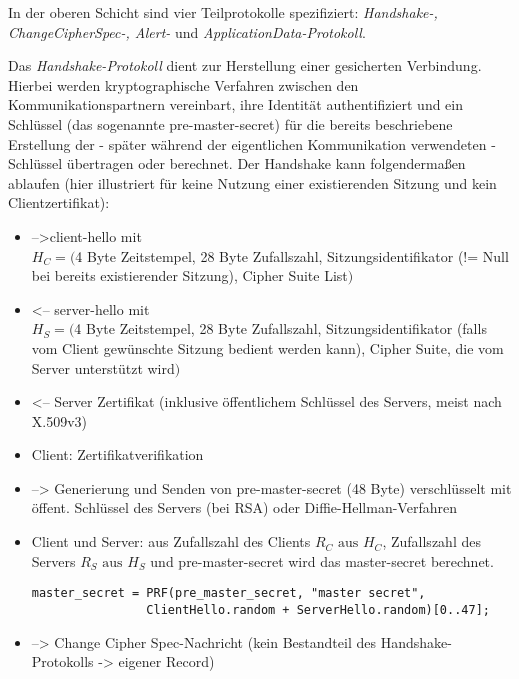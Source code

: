 \documentclass[
    12pt,
    headings=small,
    parskip=half,           %
    bibliography=totoc,
    numbers=noenddot,       %
    open=any,               %
   final                   %
    ]{scrreprt}
\newcommand{\mastersecret}		{master-secret}
\newcommand{\premastersecret}		{pre-master-secret}
\newcommand{\clienthello}			{client-hello}
\newcommand{\serverhello}			{server-hello}
\newcommand{\changecipherspec}	{Change Cipher Spec}
\begin{document}
In der oberen Schicht sind vier Teilprotokolle spezifiziert: \emph{Handshake-, ChangeCipherSpec-, Alert-} und \emph{ApplicationData-Protokoll}.

Das \emph{Handshake-Protokoll} dient zur Herstellung einer gesicherten Verbindung. Hierbei werden kryptographische Verfahren zwischen den Kommunikationspartnern vereinbart, ihre Identität authentifiziert und ein Schlüssel (das sogenannte \premastersecret{}) für die bereits beschriebene Erstellung der - später während der eigentlichen Kommunikation verwendeten - Schlüssel übertragen oder berechnet. Der Handshake kann folgendermaßen ablaufen (hier illustriert für keine Nutzung einer existierenden Sitzung und kein Clientzertifikat): 


\begin{itemize}
\item -->\clienthello{} mit \\
\(H_C = (\)4 Byte Zeitstempel, 28 Byte Zufallszahl, Sitzungsidentifikator (!= Null bei bereits existierender Sitzung), Cipher Suite List\()\)

\item <-- \serverhello{} mit \\
\(H_S = (\)4 Byte Zeitstempel, 28 Byte Zufallszahl, Sitzungsidentifikator (falls vom Client gewünschte Sitzung bedient werden kann), Cipher Suite, die vom Server unterstützt wird\()\)

\item <-- Server Zertifikat (inklusive öffentlichem Schlüssel des Servers, meist nach X.509v3)

\item Client: Zertifikatverifikation

\item --> Generierung und Senden von \premastersecret{} (48 Byte) verschlüsselt mit öffent. Schlüssel des Servers (bei RSA) oder Diffie-Hellman-Verfahren

\item Client und Server: aus Zufallszahl des Clients \(R_C \text{ aus } H_C\), Zufallszahl des Servers \(R_S \text{ aus } H_S\) und \premastersecret{} wird das \mastersecret{} berechnet.
\begin{lstlisting}
master_secret = PRF(pre_master_secret, "master secret",
				ClientHello.random + ServerHello.random)[0..47];
\end{lstlisting}

\item --> \changecipherspec{}-Nachricht (kein Bestandteil des Handshake-Protokolls -> eigener Record)


\end{itemize}
\end{document}
